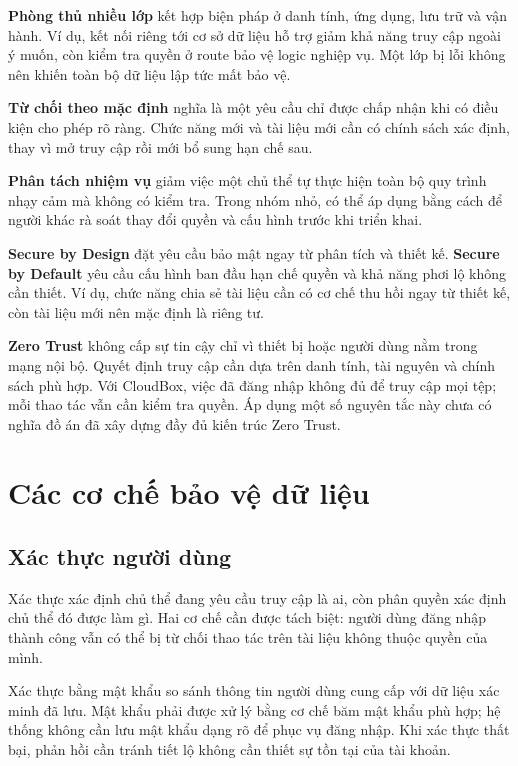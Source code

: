 \textbf{Phòng thủ nhiều lớp} kết hợp biện pháp ở danh tính, ứng dụng, lưu trữ và vận hành. Ví dụ, kết nối riêng tới cơ sở dữ liệu hỗ trợ giảm khả năng truy cập ngoài ý muốn, còn kiểm tra quyền ở route bảo vệ logic nghiệp vụ. Một lớp bị lỗi không nên khiến toàn bộ dữ liệu lập tức mất bảo vệ.

\textbf{Từ chối theo mặc định} nghĩa là một yêu cầu chỉ được chấp nhận khi có điều kiện cho phép rõ ràng. Chức năng mới và tài liệu mới cần có chính sách xác định, thay vì mở truy cập rồi mới bổ sung hạn chế sau.

\textbf{Phân tách nhiệm vụ} giảm việc một chủ thể tự thực hiện toàn bộ quy trình nhạy cảm mà không có kiểm tra. Trong nhóm nhỏ, có thể áp dụng bằng cách để người khác rà soát thay đổi quyền và cấu hình trước khi triển khai.

\textbf{Secure by Design} đặt yêu cầu bảo mật ngay từ phân tích và thiết kế. \textbf{Secure by Default} yêu cầu cấu hình ban đầu hạn chế quyền và khả năng phơi lộ không cần thiết. Ví dụ, chức năng chia sẻ tài liệu cần có cơ chế thu hồi ngay từ thiết kế, còn tài liệu mới nên mặc định là riêng tư.

\textbf{Zero Trust} không cấp sự tin cậy chỉ vì thiết bị hoặc người dùng nằm trong mạng nội bộ. Quyết định truy cập cần dựa trên danh tính, tài nguyên và chính sách phù hợp. Với CloudBox, việc đã đăng nhập không đủ để truy cập mọi tệp; mỗi thao tác vẫn cần kiểm tra quyền. Áp dụng một số nguyên tắc này chưa có nghĩa đồ án đã xây dựng đầy đủ kiến trúc Zero Trust.\cite{zerotrust}

\section{Các cơ chế bảo vệ dữ liệu}
\subsection{Xác thực người dùng}
Xác thực xác định chủ thể đang yêu cầu truy cập là ai, còn phân quyền xác định chủ thể đó được làm gì. Hai cơ chế cần được tách biệt: người dùng đăng nhập thành công vẫn có thể bị từ chối thao tác trên tài liệu không thuộc quyền của mình.

Xác thực bằng mật khẩu so sánh thông tin người dùng cung cấp với dữ liệu xác minh đã lưu. Mật khẩu phải được xử lý bằng cơ chế băm mật khẩu phù hợp; hệ thống không cần lưu mật khẩu dạng rõ để phục vụ đăng nhập. Khi xác thực thất bại, phản hồi cần tránh tiết lộ không cần thiết sự tồn tại của tài khoản.

